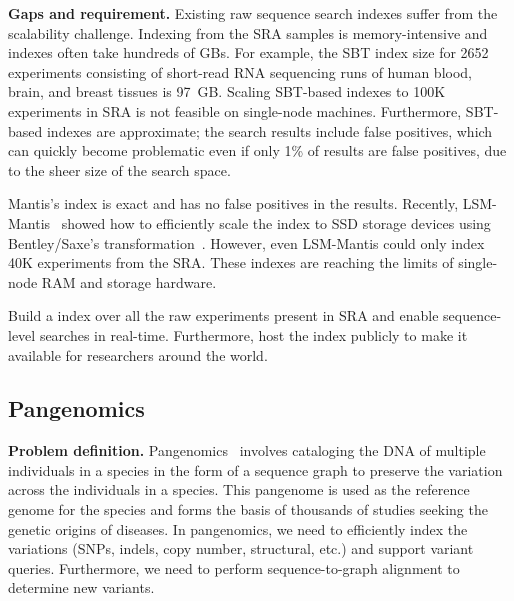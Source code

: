 \noindent
\textbf{Gaps and requirement.}
Existing raw sequence search indexes suffer from the scalability challenge. Indexing \kmers from the SRA samples is memory-intensive and indexes often take hundreds of GBs. For example, the SBT index size for 2652 experiments consisting of short-read RNA sequencing runs of human blood, brain, and breast tissues is 97~GB\@. Scaling SBT-based indexes to 100K experiments in SRA is not feasible on single-node machines.
Furthermore, SBT-based indexes are approximate; the search results include false positives, which can quickly become problematic even if only 1\% of results are false positives, due to the sheer size of the search space.

Mantis's index is exact and has no false positives in the results. Recently, LSM-Mantis~\cite{almodaresi2022incrementally} showed how to efficiently scale the index to SSD storage devices using Bentley/Saxe's transformation~\cite{BentleyS80}. However, even LSM-Mantis could only index 40K experiments from the SRA\@. These indexes are reaching the limits of single-node RAM and storage hardware.

\begin{rproblem}
Build a \kmer index over all the raw experiments present in SRA and enable sequence-level searches in real-time. Furthermore, host the index publicly to make it available for researchers around the world.
\label{rprob:seq-search}
\end{rproblem}

\subsection{Pangenomics}

\textbf{Problem definition.}
Pangenomics~\cite{sherman2020pan} involves cataloging the DNA of multiple individuals in a species in the form of a sequence graph to preserve the variation across the individuals in a species. This pangenome is used as the reference genome for the species and forms the basis of thousands of studies seeking the genetic origins of diseases. In pangenomics, we need to efficiently index the variations (SNPs, indels, copy number, structural, etc.) and support variant queries. Furthermore, we need to perform sequence-to-graph alignment to determine new variants.


